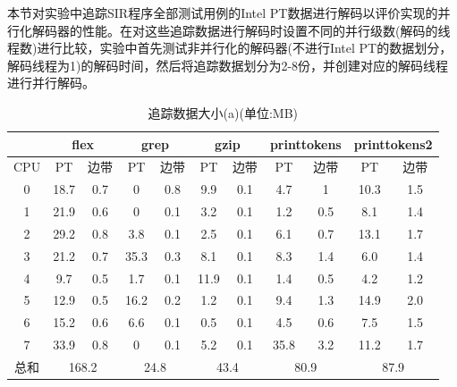 本节对实验中追踪SIR程序全部测试用例的Intel PT数据进行解码以评价实现的并行化解码器的性能。在对这些追踪数据进行解码时设置不同的并行级数(解码的线程数)进行比较，实验中首先测试非并行化的解码器(不进行Intel PT的数据划分，解码线程为1)的解码时间，然后将追踪数据划分为2-8份，并创建对应的解码线程进行并行解码。
\begin{table}[]
  \centering
  \caption{追踪数据大小(a)(单位:MB)}
  \label{tab:10}
  \begin{tabular}{c|c|c|c|c|c|c|c|c|c|c}
  \hline
        & \multicolumn{2}{c|}{flex} & \multicolumn{2}{c|}{grep} & \multicolumn{2}{c|}{gzip} & \multicolumn{2}{c|}{printtokens} & \multicolumn{2}{c}{printtokens2} \\ \hline
        CPU  & PT        & 边带      & PT        & 边带      & PT        & 边带      & PT            & 边带         & PT            & 边带          \\ \hline
  0 & 18.7      & 0.7           & 0         & 0.8           & 9.9       & 0.1           & 4.7           & 1                & 10.3          & 1.5               \\ \hline
  1 & 21.9      & 0.6           & 0         & 0.1           & 3.2       & 0.1           & 1.2           & 0.5              & 8.1           & 1.4               \\ \hline
  2 & 29.2      & 0.8           & 3.8       & 0.1           & 2.5       & 0.1           & 6.1           & 0.7              & 13.1          & 1.7               \\ \hline
  3 & 21.2      & 0.7           & 35.3      & 0.3           & 8.1       & 0.1           & 8.3           & 1.4              & 6.0           & 1.4               \\ \hline
  4 & 9.7       & 0.5           & 1.7       & 0.1           & 11.9      & 0.1           & 1.4           & 0.5              & 4.2           & 1.2               \\ \hline
  5 & 12.9      & 0.5           & 16.2      & 0.2           & 1.2       & 0.1           & 9.4           & 1.3              & 14.9          & 2.0               \\ \hline
  6 & 15.2      & 0.6           & 6.6       & 0.1           & 0.5       & 0.1           & 4.5           & 0.6              & 7.5           & 1.5               \\ \hline
  7 & 33.9      & 0.8           & 0         & 0.1           & 5.2       & 0.1           & 35.8          & 3.2              & 11.2          & 1.7               \\ \hline
  总和& \multicolumn{2}{c|}{168.2}& \multicolumn{2}{c|}{24.8}& \multicolumn{2}{c|}{43.4}& \multicolumn{2}{c|}{80.9}& \multicolumn{2}{c}{87.9}\\ \hline
  \end{tabular}
  \end{table}

